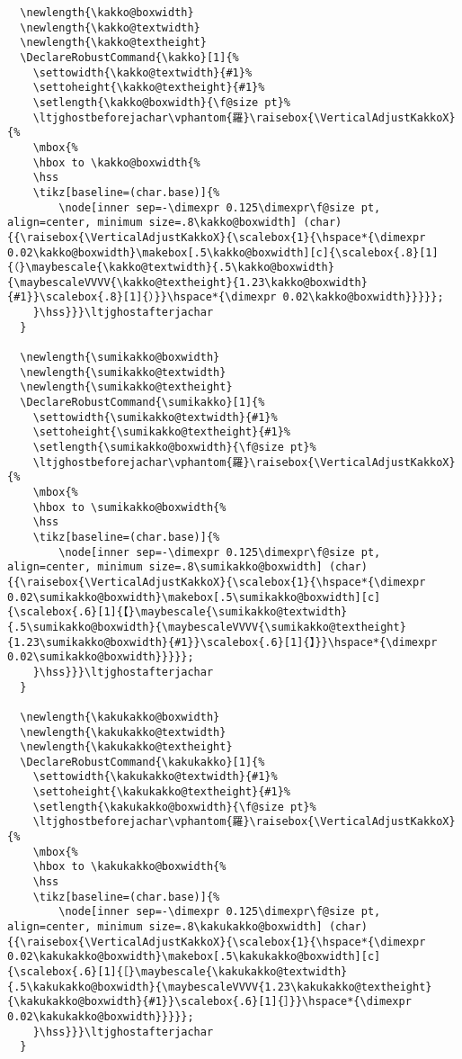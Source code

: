 \documentclass[luatex,fontsize=10pt,paper=b5,twoside]{jlreq}%
\begin{document}
\begin{lstlisting}
  \newlength{\kakko@boxwidth}
  \newlength{\kakko@textwidth}
  \newlength{\kakko@textheight}
  \DeclareRobustCommand{\kakko}[1]{%
    \settowidth{\kakko@textwidth}{#1}%
    \settoheight{\kakko@textheight}{#1}%
    \setlength{\kakko@boxwidth}{\f@size pt}%
    \ltjghostbeforejachar\vphantom{羅}\raisebox{\VerticalAdjustKakkoX}{%
    \mbox{%
    \hbox to \kakko@boxwidth{%
    \hss
    \tikz[baseline=(char.base)]{%
        \node[inner sep=-\dimexpr 0.125\dimexpr\f@size pt, align=center, minimum size=.8\kakko@boxwidth] (char) {{\raisebox{\VerticalAdjustKakkoX}{\scalebox{1}{\hspace*{\dimexpr 0.02\kakko@boxwidth}\makebox[.5\kakko@boxwidth][c]{\scalebox{.8}[1]{（}\maybescale{\kakko@textwidth}{.5\kakko@boxwidth}{\maybescaleVVVV{\kakko@textheight}{1.23\kakko@boxwidth}{#1}}\scalebox{.8}[1]{）}}\hspace*{\dimexpr 0.02\kakko@boxwidth}}}}};
    }\hss}}}\ltjghostafterjachar
  }

  \newlength{\sumikakko@boxwidth}
  \newlength{\sumikakko@textwidth}
  \newlength{\sumikakko@textheight}
  \DeclareRobustCommand{\sumikakko}[1]{%
    \settowidth{\sumikakko@textwidth}{#1}%
    \settoheight{\sumikakko@textheight}{#1}%
    \setlength{\sumikakko@boxwidth}{\f@size pt}%
    \ltjghostbeforejachar\vphantom{羅}\raisebox{\VerticalAdjustKakkoX}{%
    \mbox{%
    \hbox to \sumikakko@boxwidth{%
    \hss
    \tikz[baseline=(char.base)]{%
        \node[inner sep=-\dimexpr 0.125\dimexpr\f@size pt, align=center, minimum size=.8\sumikakko@boxwidth] (char) {{\raisebox{\VerticalAdjustKakkoX}{\scalebox{1}{\hspace*{\dimexpr 0.02\sumikakko@boxwidth}\makebox[.5\sumikakko@boxwidth][c]{\scalebox{.6}[1]{【}\maybescale{\sumikakko@textwidth}{.5\sumikakko@boxwidth}{\maybescaleVVVV{\sumikakko@textheight}{1.23\sumikakko@boxwidth}{#1}}\scalebox{.6}[1]{】}}\hspace*{\dimexpr 0.02\sumikakko@boxwidth}}}}};
    }\hss}}}\ltjghostafterjachar
  }

  \newlength{\kakukakko@boxwidth}
  \newlength{\kakukakko@textwidth}
  \newlength{\kakukakko@textheight}
  \DeclareRobustCommand{\kakukakko}[1]{%
    \settowidth{\kakukakko@textwidth}{#1}%
    \settoheight{\kakukakko@textheight}{#1}%
    \setlength{\kakukakko@boxwidth}{\f@size pt}%
    \ltjghostbeforejachar\vphantom{羅}\raisebox{\VerticalAdjustKakkoX}{%
    \mbox{%
    \hbox to \kakukakko@boxwidth{%
    \hss
    \tikz[baseline=(char.base)]{%
        \node[inner sep=-\dimexpr 0.125\dimexpr\f@size pt, align=center, minimum size=.8\kakukakko@boxwidth] (char) {{\raisebox{\VerticalAdjustKakkoX}{\scalebox{1}{\hspace*{\dimexpr 0.02\kakukakko@boxwidth}\makebox[.5\kakukakko@boxwidth][c]{\scalebox{.6}[1]{［}\maybescale{\kakukakko@textwidth}{.5\kakukakko@boxwidth}{\maybescaleVVVV{1.23\kakukakko@textheight}{\kakukakko@boxwidth}{#1}}\scalebox{.6}[1]{］}}\hspace*{\dimexpr 0.02\kakukakko@boxwidth}}}}};
    }\hss}}}\ltjghostafterjachar
  }


\end{lstlisting}
\end{document}
